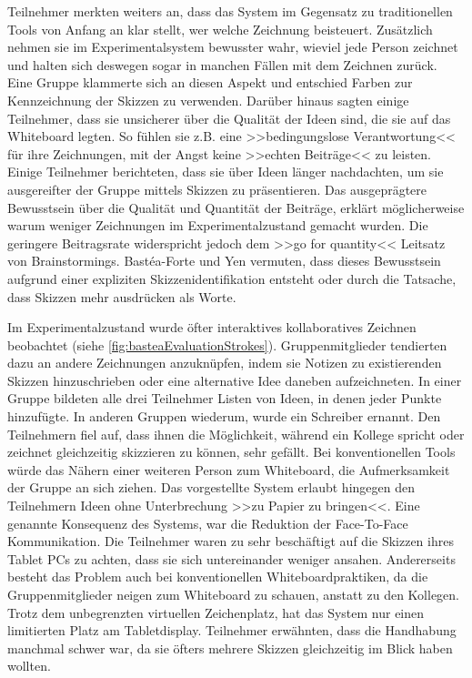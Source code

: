 \medskip Teilnehmer merkten weiters an, dass das System im Gegensatz zu traditionellen Tools von Anfang an klar stellt, wer welche Zeichnung beisteuert. Zusätzlich nehmen sie im Experimentalsystem bewusster wahr, wieviel jede Person zeichnet und halten sich deswegen sogar in manchen Fällen mit dem Zeichnen zurück. Eine Gruppe klammerte sich an diesen Aspekt und entschied Farben zur Kennzeichnung der Skizzen zu verwenden. Darüber hinaus sagten einige Teilnehmer, dass sie unsicherer über die Qualität der Ideen sind, die sie auf das Whiteboard legten. So fühlen sie z.B. eine >>bedingungslose Verantwortung<< für ihre Zeichnungen, mit der Angst keine >>echten Beiträge<< zu leisten. Einige Teilnehmer berichteten, dass sie über Ideen länger nachdachten, um sie ausgereifter der Gruppe mittels Skizzen zu präsentieren.
Das ausgeprägtere Bewusstsein über die Qualität und Quantität der Beiträge, erklärt möglicherweise warum weniger Zeichnungen im Experimentalzustand gemacht wurden. Die geringere Beitragsrate widerspricht jedoch dem >>go for quantity<< Leitsatz von Brainstormings. Bastéa-Forte und Yen vermuten, dass dieses Bewusstsein aufgrund einer expliziten Skizzenidentifikation entsteht oder durch die Tatsache, dass Skizzen mehr ausdrücken als Worte. 

\medskip Im Experimentalzustand wurde öfter interaktives kollaboratives Zeichnen beobachtet (siehe \autoref{fig:basteaEvaluationStrokes}). Gruppenmitglieder tendierten dazu an andere Zeichnungen anzuknüpfen, indem sie Notizen zu existierenden Skizzen hinzuschrieben oder eine alternative Idee daneben aufzeichneten. In einer Gruppe bildeten alle drei Teilnehmer Listen von Ideen, in denen jeder Punkte hinzufügte. In anderen Gruppen wiederum, wurde ein Schreiber ernannt.
Den Teilnehmern fiel auf, dass ihnen die Möglichkeit, während ein Kollege spricht oder zeichnet gleichzeitig skizzieren zu können, sehr gefällt. Bei konventionellen Tools würde das Nähern einer weiteren Person zum Whiteboard, die Aufmerksamkeit der Gruppe an sich ziehen. Das vorgestellte System erlaubt hingegen den Teilnehmern Ideen ohne Unterbrechung >>zu Papier zu bringen<<. 
Eine genannte Konsequenz des Systems, war die Reduktion der Face-To-Face Kommunikation. Die Teilnehmer waren zu sehr beschäftigt auf die Skizzen ihres Tablet PCs zu achten, dass sie sich untereinander weniger ansahen. Andererseits besteht das Problem auch bei konventionellen Whiteboardpraktiken, da die Gruppenmitglieder neigen zum Whiteboard zu schauen, anstatt zu den Kollegen.
Trotz dem unbegrenzten virtuellen Zeichenplatz, hat das System nur einen limitierten Platz am Tabletdisplay. Teilnehmer erwähnten, dass die Handhabung manchmal schwer war, da sie öfters mehrere Skizzen gleichzeitig im Blick haben wollten.

